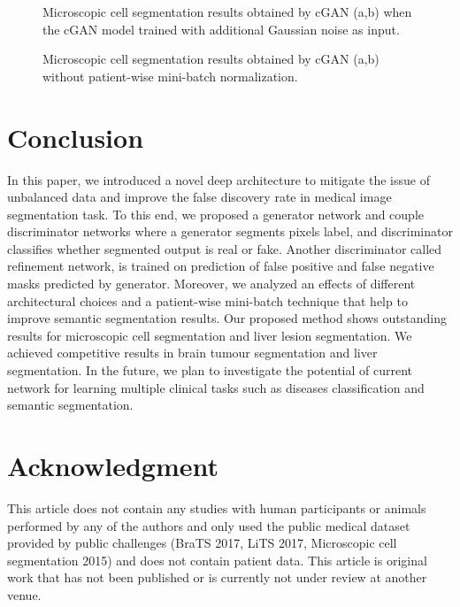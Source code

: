 \documentclass[10pt,twocolumn,letterpaper]{article}
\begin{document}
\begin{figure*}[!t]
  \hfill
  \caption{Microscopic cell segmentation results obtained by cGAN (a,b) when the cGAN model trained  with additional Gaussian noise as input.}
\label{fig_cellnoise}
\end{figure*}\begin{figure*}[!t]
  \centering
  \hfill
  \caption{Microscopic cell segmentation results obtained by cGAN (a,b) without patient-wise mini-batch normalization.}
\label{fig_cellschaffel}
\end{figure*}

\section{Conclusion}\label{conclusion}
In this paper, we introduced a novel deep architecture to mitigate the issue of unbalanced data and improve the false discovery rate in medical image segmentation task.
To this end, we proposed a generator network and couple discriminator networks where a generator segments pixels label, and discriminator classifies whether segmented output is real or fake. Another discriminator called refinement network, is trained on prediction of false positive and false negative masks predicted by generator.
Moreover, we analyzed an effects of different architectural choices and a patient-wise mini-batch technique that help to improve semantic segmentation results.
Our proposed method shows outstanding results for microscopic cell segmentation and liver lesion segmentation.
We achieved competitive results in brain tumour segmentation and liver segmentation.
In the future, we plan to investigate the potential of current network for learning multiple clinical tasks such as diseases classification and semantic segmentation.

\section{Acknowledgment}
This article does not contain any studies with human participants or animals performed by any of the authors and only used the public medical dataset provided by public challenges (BraTS 2017, LiTS 2017, Microscopic cell segmentation 2015) and does not contain patient data. This article is original work that has not been published or is currently not under review at another venue. 


{\small


}
\end{document}
